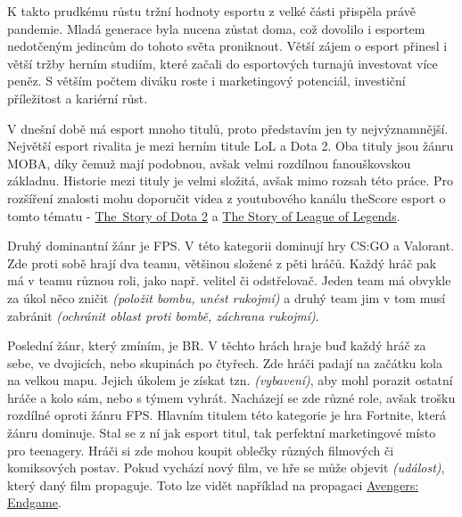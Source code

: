 K takto prudkému růstu tržní hodnoty esportu z velké části přispěla právě pandemie. Mladá generace byla nucena zůstat doma, což dovolilo i esportem nedotčeným jedincům do
tohoto světa proniknout. Větší zájem o esport přinesl i větší tržby herním studiím, které začali do esportových turnajů investovat více peněz\cite{Professeur2021}\cite{liquipedia2021}.
S větším počtem diváku roste i marketingový potenciál, investiční příležitost a kariérní růst.

V dnešní době má esport mnoho titulů, proto představím jen ty nejvýznamnější. Největší esport rivalita je mezi herním titule \ac{LoL} a Dota 2. Oba tituly jsou žánru \ac{MOBA}, díky 
čemuž mají podobnou, avšak velmi rozdílnou fanouškovskou základnu. Historie mezi tituly je velmi složitá, avšak mimo rozsah této práce. Pro rozšíření znalosti mohu doporučit videa 
z youtubového kanálu theScore esport o tomto tématu - \href{https://www.youtube.com/watch?v=h9Zv_TiVzmg}{The~Story of Dota 2} a \href{https://www.youtube.com/watch?v=tHtfD-MnQK8}{The Story of League of Legends}.

Druhý dominantní žánr je \ac{FPS}. V této kategorii dominují hry \ac{CS:GO} a Valorant. Zde proti sobě hrají dva teamu, většinou složené z pěti hráčů. Každý hráč pak má v teamu různou roli, jako např. velitel
či odstřelovač. Jeden team má obvykle za úkol něco zničit \textit{(položit bombu, unést rukojmí)} a druhý team jim v tom musí zabránit \textit{(ochránit oblast proti bombě, záchrana rukojmí)}.

Poslední žánr, který zmíním, je \ac{BR}. V těchto hrách hraje buď každý hráč za sebe, ve dvojicích, nebo skupinách po čtyřech. Zde hráči padají na začátku kola na velkou mapu. Jejich úkolem je
získat tzn.  \textit{(vybavení)}, aby mohl porazit ostatní hráče a kolo sám, nebo s týmem vyhrát. Nacházejí se zde různé role, avšak trošku rozdílné oproti žánru \ac{FPS}. Hlavním titulem
této kategorie je hra Fortnite, která žánru dominuje. Stal se z ní jak esport titul, tak perfektní marketingové místo pro teenagery. Hráči si zde mohou koupit oblečky různých filmových či komiksových postav.
Pokud vychází nový film, ve hře se může objevit  \textit{(událost)}, který daný film propaguje. Toto lze vidět například na propagaci \href{https://www.youtube.com/watch?v=TanGK9o_d24}{Avengers: Endgame}.

